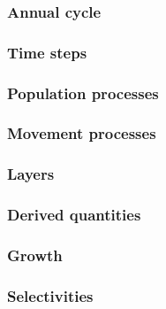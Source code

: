 \subsubsection{Annual cycle}

\subsubsection{Time steps}

\subsubsection{Population processes}

\subsubsection{Movement processes}

\subsubsection{Layers}

\subsubsection{Derived quantities}

\subsubsection{Growth}

\subsubsection{Selectivities}


